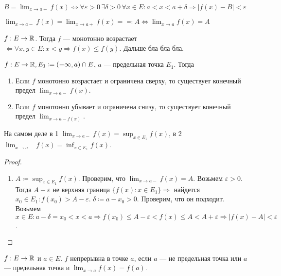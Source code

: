 \begin{remark}
    $B = \lim_{x \to a+} f(x) \iff \forall \varepsilon > 0 \, \exists \delta > 0 \, \forall x \in E: a < x < a + \delta \Rightarrow |f(x) - B| < \varepsilon$
\end{remark}
\begin{remark}
    $\lim_{x\to a-} f(x) = \lim_{x \to a+} f(x) = \eqqcolon A \iff \lim_{x \to a} f(x) = A$
\end{remark}
\begin{definition}
    $f: E \to \mathbb{R}$. Тогда  $f$ --- монотонно возрастает $\Leftarrow \forall x, y \in E: x < y \Rightarrow f(x) \le f(y)$.
    Дальше бла-бла-бла.
\end{definition}
\begin{theorem}
    $f: E \to \mathbb{R}, E_1 \coloneqq (-\infty, a) \cap E$,  $a$ --- предельная точка  $E_1$. Тогда
     \begin{enumerate}
         \item Если $f$ монотонно возрастает и ограничена сверху, то существует конечный предел  $\lim_{x \to a-} f(x)$.
         \item Если $f$ монотонно убывает и ограничена снизу, то существует конечный предел  $\lim_{x \to a- f(x)}$.
    \end{enumerate}
\end{theorem}
\begin{remark}
    На самом деле в 1  $\lim_{x \to a-} f(x) = \sup_{x \in E_1} f(x)$, в  2  $\lim_{x \to a-} f(x) = \inf_{x \in E_1} f(x)$.
\end{remark}
\begin{proof}
    \slashn
    \begin{enumerate}
        \item $A \coloneqq \sup_{x \in E_1} f(x)$. Проверим, что  $\lim_{x \to a-} f(x) = A$. Возьмем  $\varepsilon > 0$. Тогда  $A - \varepsilon$ не верхняя граница $\{f(x): x \in E_1\} \Rightarrow$ найдется $x_0 \in E_1: f(x_0) > A - \varepsilon$. $\delta \coloneqq a - x_0 > 0$. Проверим, что он подходит. Возьмем  $x \in E: a - \delta = x_0 < x < a \Rightarrow f(x_0) \le A-\varepsilon < f(x) \le A < A + \varepsilon \Rightarrow |f(x) - A| < \varepsilon$.
    \end{enumerate}
\end{proof}
\begin{definition}
    $f: E \to \mathbb{R}$ и  $a \in E$.  $f$ непрерывна в точке  $a$, если  $a$ --- не предельная точка или  $a$ --- предельная точка и  $\lim_{x \to a} f(x) = f(a)$.
\end{definition}
